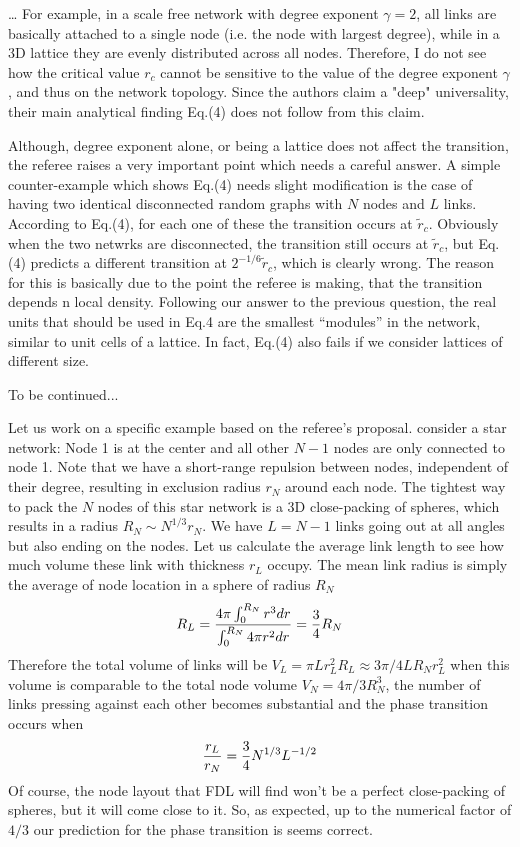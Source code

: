 \documentclass[11pt]{article}
\begin{document}
\begin{response}{
\dots 
For example, in a scale free network with degree exponent $\gamma=2$, all links are basically 
attached to a single node (i.e. the node with largest degree), while in a 3D lattice they are evenly distributed across all nodes. Therefore, I do not see how the critical value $r_c$ cannot be sensitive to the value of the degree exponent $\gamma$, and thus on the network topology. Since the authors claim a "deep" universality, their main analytical finding Eq.(4) does not follow from this claim.

}
Although, degree exponent alone, or being a lattice does not affect the transition, the referee raises a very important point which needs a careful answer.
A simple counter-example which shows Eq.(4) needs slight modification is the case of having two identical disconnected random graphs with $N$ nodes and $L$ links. 
According to Eq.(4), for each one of these the transition occurs at $\tilde{r}_c$. 
Obviously when the two netwrks are disconnected, the transition still occurs at $\tilde{r}_c$, but Eq.(4) predicts a different transition at $2^{-1/6}\tilde{r}_c$, which is clearly wrong. 
The reason for this is basically due to the point the referee is making, that the transition depends n local density. 
Following our answer to the previous question,  the real units that should be used in Eq.4 are the smallest ``modules'' in the network, similar to unit cells of a lattice.
In fact, Eq.(4) also fails if we consider lattices of different size.

{\color{red} To be continued...}

Let us work on a specific example based on the referee's proposal.
consider a star network: 
Node 1 is at the center and all other $N-1$ nodes are only connected to node 1. 
Note that we have a short-range repulsion between nodes, independent of their degree, resulting in exclusion radius $r_N$ around each node. 
The tightest way to pack the $N$ nodes of this star network is a 3D close-packing of spheres, which results in a radius $R_N\sim N^{1/3}r_N$.
We have $L=N-1$ links going out at all angles but also ending on the nodes.
Let us calculate the average link length to see how much volume these link with thickness $r_L$ occupy. 
The mean link radius is simply the average of node location in a sphere of radius $R_N$ 
\[R_L =  \frac{4\pi \int_0^{R_N} r^3dr }{\int_0^{R_N} 4\pi r^2 dr} = {3\over 4} R_N \]
Therefore the total volume of links will be $V_L = \pi L r_L^2 R_L \approx 3\pi/4 L R_N r_L^2 $ when this volume is comparable to the total node volume $V_N = 4\pi/3 R_N^3$, the number of links pressing against each other becomes substantial and the phase transition occurs when
%
\[ {r_L\over r_N} = {3\over 4} N^{1/3}L^{-1/2}\]
%
Of course, the node layout that FDL will find won't be a perfect close-packing of spheres, but it will come close to it.
So, as expected, up to the numerical factor of $4/3$ our prediction for the phase transition is seems correct.


\end{response}
\end{document}
